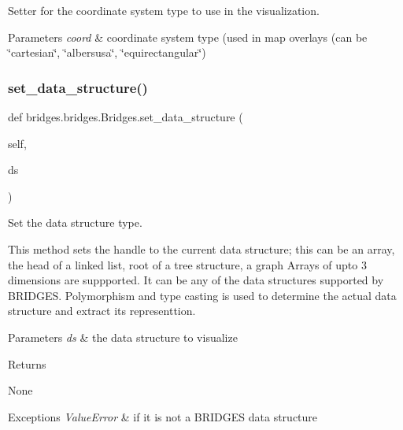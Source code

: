 Setter for the coordinate system type to use in the visualization. 


\begin{DoxyParams}{Parameters}
{\em coord} & coordinate system type (used in map overlays (can be \char`\"{}cartesian\char`\"{}, \char`\"{}albersusa\char`\"{}, \char`\"{}equirectangular\char`\"{}) \\
\hline
\end{DoxyParams}
\mbox{\label{classbridges_1_1bridges_1_1_bridges_a868f02fa66c87c1a1fc7bd6fbc799291}} 
\subsubsection{\texorpdfstring{set\+\_\+data\+\_\+structure()}{set\_data\_structure()}}
{\footnotesize\ttfamily def bridges.\+bridges.\+Bridges.\+set\+\_\+data\+\_\+structure (\begin{DoxyParamCaption}\item[{}]{self,  }\item[{}]{ds }\end{DoxyParamCaption})}



Set the data structure type. 

This method sets the handle to the current data structure; this can be an array, the head of a linked list, root of a tree structure, a graph Arrays of upto 3 dimensions are suppported. It can be any of the data structures supported by B\+R\+I\+D\+G\+ES. Polymorphism and type casting is used to determine the actual data structure and extract its representtion.


\begin{DoxyParams}{Parameters}
{\em ds} & the data structure to visualize \\
\hline
\end{DoxyParams}
\begin{DoxyReturn}{Returns}


None
\end{DoxyReturn}

\begin{DoxyExceptions}{Exceptions}
{\em Value\+Error} & if it is not a B\+R\+I\+D\+G\+ES data structure \\
\hline
\end{DoxyExceptions}
\mbox{\label{classbridges_1_1bridges_1_1_bridges_aba86088c031b505bbe88dbc530bf1331}} 
